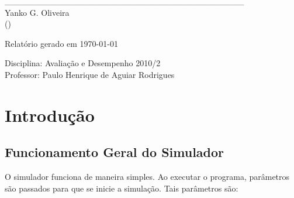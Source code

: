 \documentclass[a4paper,10pt]{article}
\begin{document}
\begin{titlepage}
\begin{center}
\_\_\_\_\_\_\_\_\_\_\_\_\_\_\_\_\_\_\_\_\_\_\_\_\_\_\_\_\_\_\_\_\_\_\_\_\_\_\_\\
Yanko G. Oliveira\\()\\

\vspace{0.5cm}

\vspace{1cm}

Relatório gerado em \today

\normalsize
\end{center}

\vfill

\begin{flushright}
Disciplina: Avaliação e Desempenho 2010/2\\
Professor: Paulo Henrique de Aguiar Rodrigues\\
\end{flushright}

\vspace{2cm}

\end{titlepage}

\pagebreak

\tableofcontents
\pagebreak

\section{Introdução}
\subsection{Funcionamento Geral do Simulador}
    O simulador funciona de maneira simples. Ao executar o programa, parâmetros são passados para que se inicie a simulação. Tais parâmetros são:
\end{document}

